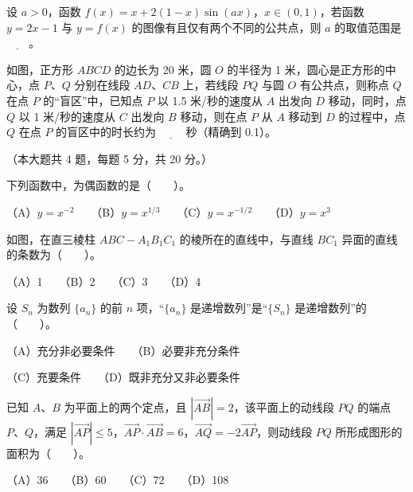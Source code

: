 \begin{question}
设 $a>0$，函数 $f(x)=x+2(1-x)\sin(ax)$，$x\in(0,1)$，若函数 $y=2x-1$ 与 $y=f(x)$ 的图像有且仅有两个不同的公共点，则 $a$ 的取值范围是 $\underline{\qquad}$。

\Needspace{0.4\textheight}
\end{question}
\begin{question}
如图，正方形 $ABCD$ 的边长为 20 米，圆 $O$ 的半径为 1 米，圆心是正方形的中心，点 $P\text{、}Q$ 分别在线段 $AD\text{、}CB$ 上，若线段 $PQ$ 与圆 $O$ 有公共点，则称点 $Q$ 在点 $P$ 的“盲区”中，已知点 $P$ 以 1.5 米/秒的速度从 $A$ 出发向 $D$ 移动，同时，点 $Q$ 以 1 米/秒的速度从 $C$ 出发向 $B$ 移动，则在点 $P$ 从 $A$ 移动到 $D$ 的过程中，点 $Q$ 在点 $P$ 的盲区中的时长约为 $\underline{\qquad}$ 秒（精确到 0.1）。
\nopagebreak[4]
\begin{center}\end{center}
\nopagebreak[4]
\end{question}

（本大题共 4 题，每题 5 分，共 20 分。）

\begin{question}
下列函数中，为偶函数的是\mbox{（　　）}。

（A）$y=x^{-2}$　　（B）$y=x^{1/3}$　　（C）$y=x^{-1/2}$　　（D）$y=x^3$

\Needspace{0.4\textheight}
\end{question}
\begin{question}
如图，在直三棱柱 $ABC-A_1B_1C_1$ 的棱所在的直线中，与直线 $BC_1$ 异面的直线的条数为\mbox{（　　）}。

（A）1　　（B）2　　（C）3　　（D）4
\nopagebreak[4]
\begin{center}\end{center}
\nopagebreak[4]
\end{question}
\begin{question}
设 $S_n$ 为数列 $\{a_n\}$ 的前 $n$ 项，“$\{a_n\}$ 是递增数列”是“$\{S_n\}$ 是递增数列”的\mbox{（　　）}。

（A）充分非必要条件　　（B）必要非充分条件

（C）充要条件　　（D）既非充分又非必要条件

\end{question}
\begin{question}
已知 $A\text{、}B$ 为平面上的两个定点，且 $|\overrightarrow{AB}|=2$，该平面上的动线段 $PQ$ 的端点 $P\text{、}Q$，满足 $|\overrightarrow{AP}|\leq 5$，$\overrightarrow{AP}\cdot\overrightarrow{AB}=6$，$\overrightarrow{AQ}=-2\overrightarrow{AP}$，则动线段 $PQ$ 所形成图形的面积为\mbox{（　　）}。

（A）36　　（B）60　　（C）72　　（D）108

\end{question}

